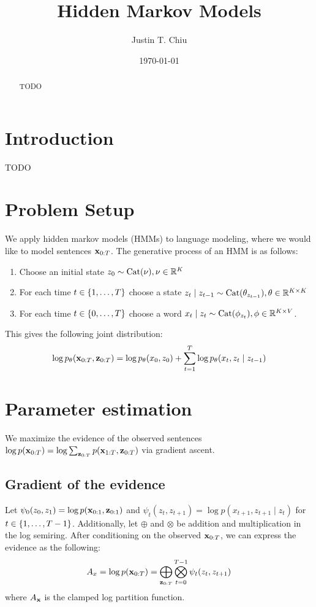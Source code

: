 \documentclass[12pt]{article}
\title{Hidden Markov Models}
\author{
Justin T. Chiu
}
\date{\today}
\begin{document}
\maketitle

\begin{abstract}
TODO
\end{abstract}

\section{Introduction}
TODO

\section{Problem Setup}
We apply hidden markov models (HMMs) to language modeling,
where we would like to model sentences $\mathbf{x}_{0:T}$.
The generative process of an HMM is as follows:
\begin{enumerate}
\item Choose an initial state $z_0 \sim \mathrm{Cat}(\nu), \nu \in \mathbb{R}^K$
\item For each time $t \in \left\{1, \ldots, T\right\}$ choose a state
$z_t \mid z_{t-1} \sim \mathrm{Cat}(\theta_{z_{t-1}}), \theta \in \mathbb{R}^{K \times K}$
\item For each time $t \in \left\{0, \ldots, T\right\}$ choose a word
$x_t \mid z_t \sim \mathrm{Cat}(\phi_{z_t}), \phi \in \mathbb{R}^{K \times V}$.
\end{enumerate}

This gives the following joint distribution:
\begin{equation}
\log p_\theta(\mathbf{x}_{0:T}, \mathbf{z}_{0:T})
= \log p_\theta(x_0, z_0) + \sum_{t=1}^T \log p_\theta(x_t, z_t \mid z_{t-1})\\
\end{equation}

\section{Parameter estimation}
We maximize the evidence of the observed sentences
$\log p(\mathbf{x}_{0:T}) = \log \sum_{\mathbf{z}_{0:T}} p(\mathbf{x}_{1:T}, \mathbf{z}_{0:T})$
via gradient ascent.

\subsection{Gradient of the evidence}
Let $\psi_0(z_0, z_1) = \log p(\mathbf{x}_{0:1}, \mathbf{z}_{0:1})$ and
$\psi_t(z_{t}, z_{t+1}) = \log p(x_{t+1}, z_{t+1} \mid z_{t})$ for $t \in \left\{1, \ldots, T-1\right\}$.
Additionally, let $\oplus$ and $\otimes$ be addition and multiplication in the log semiring.
After conditioning on the observed $\mathbf{x}_{0:T}$, we can express the evidence as the following:
$$A_x = \log p(\mathbf{x}_{0:T}) = \bigoplus_{\mathbf{z}_{0:T}}\bigotimes_{t=0}^{T-1} \psi_t(z_t, z_{t+1})$$
where $A_{\mathbf{x}}$ is the clamped log partition function.
\end{document}
